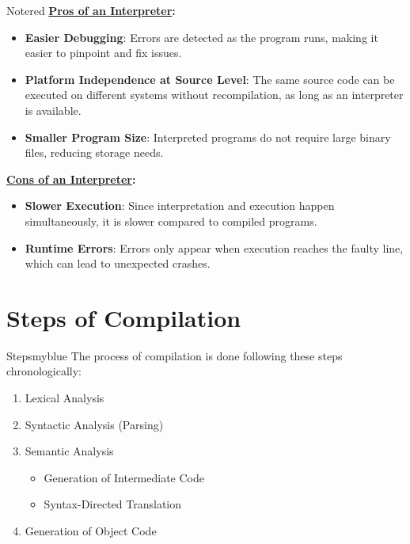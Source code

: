 \begin{prettyBox}{Note}{red}
    \textbf{\underline{Pros of an Interpreter}:}
    \begin{itemize}
        \item \textbf{Easier Debugging}: Errors are detected as the program runs, making it easier to pinpoint and fix issues.
        \item \textbf{Platform Independence at Source Level}: The same source code can be executed on different systems without recompilation, as long as an interpreter is available.
        \item \textbf{Smaller Program Size}: Interpreted programs do not require large binary files, reducing storage needs.
    \end{itemize}
    
    \textbf{\underline{Cons of an Interpreter}:}
    \begin{itemize}
        \item \textbf{Slower Execution}: Since interpretation and execution happen simultaneously, it is slower compared to compiled programs.
        \item \textbf{Runtime Errors}: Errors only appear when execution reaches the faulty line, which can lead to unexpected crashes.
    \end{itemize}
\end{prettyBox}

\vspace{0.25cm}
\section{Steps of Compilation}
\begin{prettyBox}{Steps}{myblue}
The process of compilation is done following these steps chronologically:
\begin{enumerate}
    \item Lexical Analysis
    \item Syntactic Analysis (Parsing)
    \item Semantic Analysis
        \begin{itemize}
            \item Generation of Intermediate Code
            \item Syntax-Directed Translation
        \end{itemize}
    \item Generation of Object Code
\end{enumerate}
\end{prettyBox}

